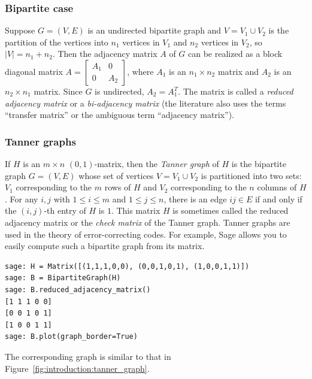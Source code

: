 \subsubsection{Bipartite case}

Suppose $G = (V, E)$ is an undirected bipartite graph and
$V = V_1 \cup V_2$ is the partition of the vertices into $n_1$
vertices in $V_1$ and $n_2$ vertices in $V_2$, so $|V| = n_1 + n_2$.
Then the adjacency matrix $A$ of $G$ can be realized as a block
diagonal matrix
$A
=
\begin{bmatrix}
A_1 & 0 \\
0 & A_2
\end{bmatrix}$,
where $A_1$ is an $n_1 \times n_2$ matrix and $A_2$ is an
$n_2 \times n_1$ matrix. Since $G$ is undirected, $A_2 = A_1^T$.
The matrix is called a \emph{reduced adjacency matrix} or a
\emph{bi-adjacency matrix} (the literature also uses
the terms ``transfer matrix'' or the ambiguous term
``adjacency matrix'').



\subsubsection{Tanner graphs}

If $H$ is an $m \times n$ $(0,1)$-matrix, then the \emph{Tanner graph}
of $H$ is the bipartite graph $G = (V,E)$ whose set of vertices
$V = V_1 \cup V_2$ is partitioned into two sets: $V_1$ corresponding
to the $m$ rows of $H$ and $V_2$ corresponding to the $n$ columns of $H$.
For any $i,j$ with $1 \leq i \leq m$ and $1 \leq j \leq n$, there is
an edge $ij \in E$ if and only if the $(i,j)$-th entry of $H$ is
$1$. This matrix $H$ is sometimes called the
reduced adjacency matrix or the \emph{check matrix} of the Tanner
graph. Tanner graphs are used in the theory of error-correcting
codes. For example, Sage allows you to easily compute such a bipartite
graph from its matrix.
%
\begin{lstlisting}
sage: H = Matrix([(1,1,1,0,0), (0,0,1,0,1), (1,0,0,1,1)])
sage: B = BipartiteGraph(H)
sage: B.reduced_adjacency_matrix()
[1 1 1 0 0]
[0 0 1 0 1]
[1 0 0 1 1]
sage: B.plot(graph_border=True)
\end{lstlisting}
%
The corresponding graph is similar to that in
Figure~\ref{fig:introduction:tanner_graph}.

